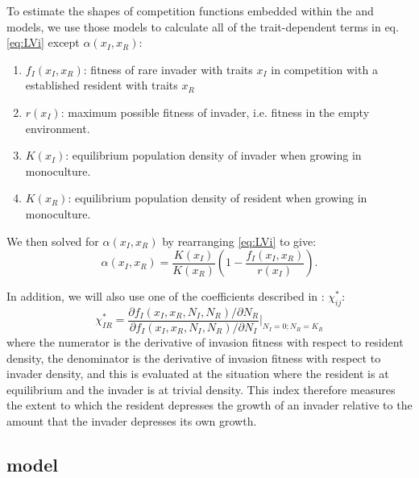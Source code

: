 \documentclass[a4paper,11pt]{article}
\begin{document}
To estimate the shapes of competition functions embedded within the \Rstar
and \plant models, we use those models to calculate all of the trait-dependent
terms in eq. \ref{eq:LVi} except $\alpha(x_I, x_R)$:
\begin{enumerate}
\item $f_I(x_I, x_R)$: fitness of rare invader with traits $x_I$  in
  competition with a established resident with traits $x_R$
\item $r(x_I)$: maximum possible fitness of invader, i.e. fitness in
  the empty environment.
\item $K(x_I)$: equilibrium population density of invader when growing
  in monoculture.
\item $K(x_R)$: equilibrium population density of resident when
  growing in monoculture.
\end{enumerate}
We then solved for $\alpha(x_I, x_R)$ by rearranging  \ref{eq:LVi} to give:
\begin{equation}
  \label{eq:alpha}
  \alpha(x_I, x_R) = \frac{K(x_I)}{K(x_R)}
  \left(1 - \frac{f_I(x_I, x_R)}{r(x_I)}\right).
\end{equation}

In addition, we will also use one of the coefficients described in
\citet{Abrams-2008}: $\chi_{ij}^{*}$:
%
\begin{equation}
  \label{eq:abrams-coef}
  \chi_{IR}^{*} =
  \frac{\partial f_I(x_I, x_R, N_I, N_R) /  \partial N_R}%
  {\partial f_I(x_I, x_R, N_I, N_R) / \partial N_I}
  \bigg|_{N_I=0; N_R=K_{R}}
\end{equation}
%
where the numerator is the derivative of invasion fitness with respect
to resident density, the denominator is the derivative of invasion
fitness with respect to invader density, and this is evaluated at the
situation where the resident is at equilibrium and the invader is at
trivial density.  This index therefore measures the extent to which
the resident depresses the growth of an invader relative to the amount
that the invader depresses its own growth.

\subsection{\Rstar model}

\end{document}
